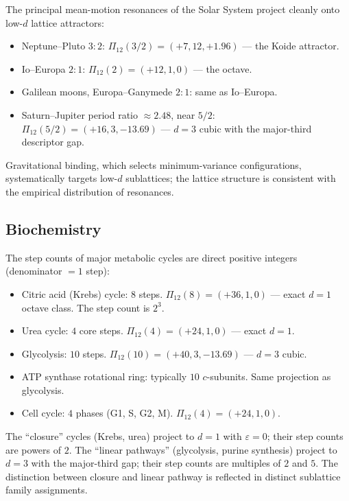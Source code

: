 \documentclass[11pt,a4paper]{article}
\theoremstyle{definition}
\theoremstyle{remark}
\newcommand{\eps}{\varepsilon}
\begin{document}
The principal mean-motion resonances of the Solar System project cleanly onto low-$d$ lattice attractors:
\begin{itemize}[leftmargin=*]
\item Neptune--Pluto $3{:}2$: $\Pi_{12}(3/2) = (+7, 12, +1.96)$ --- the Koide attractor.
\item Io--Europa $2{:}1$: $\Pi_{12}(2) = (+12, 1, 0)$ --- the octave.
\item Galilean moons, Europa--Ganymede $2{:}1$: same as Io--Europa.
\item Saturn--Jupiter period ratio $\approx 2.48$, near $5/2$: $\Pi_{12}(5/2) = (+16, 3, -13.69)$ --- $d=3$ cubic with the major-third descriptor gap.
\end{itemize}

Gravitational binding, which selects minimum-variance configurations, systematically targets low-$d$ sublattices; the lattice structure is consistent with the empirical distribution of resonances.

\subsection{Biochemistry}\label{subsec:biology}

The step counts of major metabolic cycles are direct positive integers (denominator $=1$ step):
\begin{itemize}[leftmargin=*]
\item Citric acid (Krebs) cycle: $8$ steps. $\Pi_{12}(8) = (+36, 1, 0)$ --- exact $d=1$ octave class. The step count is $2^{3}$.
\item Urea cycle: $4$ core steps. $\Pi_{12}(4) = (+24, 1, 0)$ --- exact $d=1$.
\item Glycolysis: $10$ steps. $\Pi_{12}(10) = (+40, 3, -13.69)$ --- $d=3$ cubic.
\item ATP synthase rotational ring: typically $10$ $c$-subunits. Same projection as glycolysis.
\item Cell cycle: $4$ phases (G1, S, G2, M). $\Pi_{12}(4) = (+24, 1, 0)$.
\end{itemize}

The ``closure'' cycles (Krebs, urea) project to $d=1$ with $\eps=0$; their step counts are powers of $2$. The ``linear pathways'' (glycolysis, purine synthesis) project to $d=3$ with the major-third gap; their step counts are multiples of $2$ and $5$. The distinction between closure and linear pathway is reflected in distinct sublattice family assignments.
\end{document}
